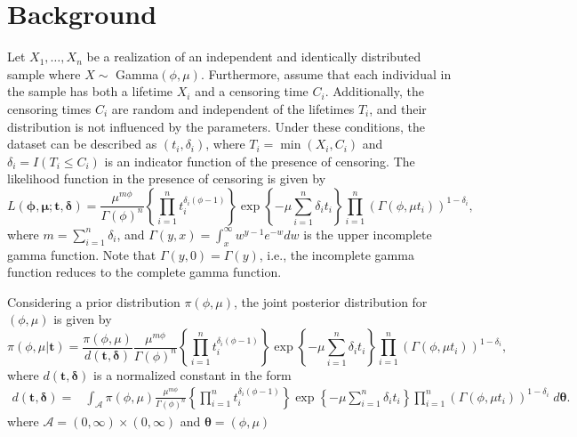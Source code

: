 \documentclass[12pt]{article} %
\theoremstyle{plain}%
\theoremstyle{definition}
\theoremstyle{remark}
\begin{document}
\section{Background}\label{sec:2}

Let $X_1,\ldots,X_n$ be a realization of an independent and identically distributed sample where $X\sim$ Gamma$(\phi,\mu)$. Furthermore, assume that each individual in the sample has both a lifetime $X_i$ and a censoring time $C_i$. Additionally, the censoring times $C_i$ are random and independent of the lifetimes $T_i$, and their distribution is not influenced by the parameters. Under these conditions, the dataset can be described as $(t_i,\delta_i)$, where $T_i=\min(X_i,C_i)$ and $\delta_i=I(T_i\leq C_i)$ is an indicator function of the presence of censoring. The likelihood function in the presence of censoring is given by
\begin{equation*}L(\boldsymbol{\phi,\mu; t,\delta})
=\frac{\mu^{m\phi}}{\Gamma(\phi)^n}\left\{\prod_{i=1}^n{t_i^{\delta_i(\phi-1)}}\right\}\exp\left\{-\mu\sum_{i=1}^n {\delta_i}t_i\right\}\prod_{i=1}^n\left(\Gamma(\phi,\mu t_i)\right)^{1-\delta_i},
\end{equation*}
where $m=\sum_{i=1}^{n}\delta_i$, and $\Gamma(y,x)  =\int_{x}^{\infty}{w^{y-1}e^{-w}dw}$ is the upper incomplete gamma function. Note that $\Gamma(y,0)=\Gamma(y)$, i.e., the incomplete gamma function reduces to the complete gamma function.

Considering a prior distribution $\pi(\phi,\mu)$, the joint posterior distribution for $(\phi,\mu)$ is given by 
\begin{equation}\label{principal}
\pi(\phi,\mu|\boldsymbol{t})=\frac{\pi(\phi,\mu)}{d(\boldsymbol{t,\delta})} \frac{\mu^{m\phi}}{\Gamma(\phi)^n}\left\{\prod_{i=1}^n{t_i^{\delta_i(\phi-1)}}\right\}\exp\left\{-\mu\sum_{i=1}^n {\delta_i}t_i\right\}\prod_{i=1}^n\left(\Gamma(\phi,\mu t_i)\right)^{1-\delta_i},
\end{equation}
where  $d(\boldsymbol{t,\delta})$ is a normalized constant in the form 
\begin{align*}%
d(\boldsymbol{t,\delta})=&\int_{\mathcal{A}} \pi(\phi,\mu)\frac{\mu^{m\phi}}{\Gamma(\phi)^n}\left\{\prod_{i=1}^n{t_i^{\delta_i(\phi-1)}}\right\}\exp\left\{-\mu\sum_{i=1}^n {\delta_i}t_i\right\}\prod_{i=1}^n\left(\Gamma(\phi,\mu t_i)\right)^{1-\delta_i}\; d\boldsymbol{\theta}.
\end{align*}
where $\mathcal{A}=(0,\infty)\times (0,\infty)$ and $\boldsymbol{\theta}=(\phi,\mu)$
\end{document}
